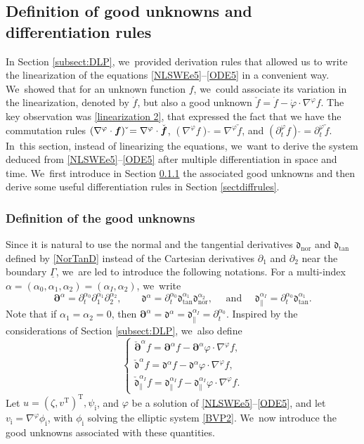 \documentclass[11pt]{article}
\newcommand{\dtan}{{\mathfrak d}_\mathrm{tan}}
\newcommand{\dnor}{{\mathfrak d}_\mathrm{nor}}
\newcommand{\dpar}{{\mathfrak d}_{\parallel}}
\newcommand{\dt}{\partial_t}
\newcommand{\ul}[1]{\underline{#1}}
\newcommand{\itGamma}{\mathit{\Gamma}}
\newcommand{\cpalpha}{\check{\bm{\partial}}^{\alpha} }
\newcommand{\cmfalpha}{\check{\mathfrak{d}}^{\alpha}}
\newcommand{\cmfpalphaI}{\check{\mathfrak{d}}_{\parallel}^{\alpha_I}}
\theoremstyle{definition}
\begin{document}
\subsection{Definition of good unknowns and differentiation rules}\label{subsect:defGU}
In Section \ref{subsect:DLP}, we~provided derivation rules that allowed us to write the linearization of the equations \eqref{NLSWEe5}--\eqref{ODE5} in a convenient way. We~showed that for an unknown function $f$, we~could associate its variation in the linearization, denoted by $\dot{f}$, but also a good unknown $\check{f}=\dot{f}-\dot{\varphi}\cdot\nabla^\varphi f$.
The key observation was \eqref{linearization 2}, that expressed the fact that we have the commutation rules
$(\nabla^\varphi\cdot \mbox{\boldmath$f$})\,\check{} = \nabla^\varphi\cdot \check{\mbox{\boldmath$f$}}$, $(\nabla^\varphi f)\,\check{}
= \nabla^\varphi \check{f}$, and $(\dt^\varphi f)\,\check{} = \dt^\varphi \check{f}$. In~this section, instead of linearizing the equations, we~want to derive the system deduced from \eqref{NLSWEe5}--\eqref{ODE5} after multiple differentiation in space and time. We~first introduce in Section \ref{sectdefGU} the associated good unknowns and then derive some useful differentiation rules in Section \ref{sectdiffrules}.

\subsubsection{Definition of the good unknowns}\label{sectdefGU}
Since it is natural to use the normal and the tangential derivatives $\dnor$ and $\dtan$ defined by \eqref{NorTanD}
instead of the Cartesian derivatives $\partial_1$ and $\partial_2$ near the boundary $\ul{\itGamma}$, we~are led to introduce the following notations.
For a multi-index $\alpha=(\alpha_0,\alpha_1,\alpha_2)=(\alpha_I,\alpha_2)$, we~write
\[
\bm{\partial}^\alpha=\dt^{\alpha_0}\partial_1^{\alpha_1}\partial_2^{\alpha_2}, \qquad
\mathfrak{d}^\alpha=\dt^{\alpha_0}\dtan^{\alpha_1}\dnor^{\alpha_2},
\quad\mbox{ and } \quad
\dpar^{\alpha_I}=\dt^{\alpha_0}\dtan^{\alpha_1}.
\]
Note that if $\alpha_1=\alpha_2=0$, then $\bm{\partial}^\alpha=\mathfrak{d}^\alpha=\dpar^{\alpha_I}=\dt^{\alpha_0}$.
Inspired by the considerations of Section \ref{subsect:DLP}, we~also define
\[
\begin{cases}
\cpalpha f = \bm{\partial}^\alpha f -\bm{\partial}^\alpha\varphi\cdot \nabla^\varphi f, \\
\cmfalpha f=\mathfrak{d}^\alpha f -\mathfrak{d}^\alpha\varphi\cdot \nabla^\varphi f, \\
\cmfpalphaI f=\dpar^{\alpha_I} f -\dpar^{\alpha_I}\varphi\cdot \nabla^\varphi f.
\end{cases}
\]
Let $u=(\zeta,v^\mathrm{T})^\mathrm{T},\psi_\mathrm{i}$, and $\varphi$ be a solution of \eqref{NLSWEe5}--\eqref{ODE5},
and let $v_\mathrm{i}=\nabla^\varphi\phi_\mathrm{i}$, with $\phi_\mathrm{i}$ solving the elliptic system \eqref{BVP2}. We~now introduce the good unknowns associated with these quantities.
\end{document}
